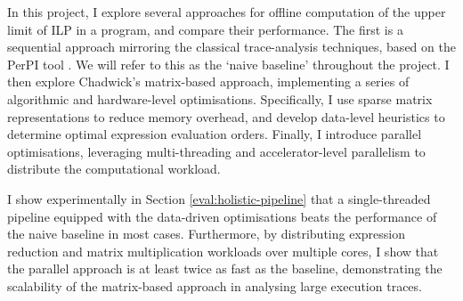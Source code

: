 In this project, I explore several approaches for offline computation of the upper limit of ILP in a program, and
compare their performance.
The first is a sequential approach mirroring the classical trace-analysis techniques, based on the PerPI tool \cite{perpi}. We will 
refer to this as the `naive baseline' throughout the project.
I then explore Chadwick's matrix-based approach, implementing a series of algorithmic and hardware-level optimisations.
Specifically, I use sparse matrix representations to reduce memory overhead, and develop data-level heuristics to 
determine optimal expression evaluation orders. Finally, I introduce parallel optimisations, leveraging multi-threading 
and accelerator-level parallelism to distribute the computational workload.

I show experimentally in Section \ref{eval:holistic-pipeline}
that a single-threaded pipeline equipped with the data-driven optimisations beats the performance 
of the naive baseline in most cases. Furthermore, by distributing expression reduction and matrix multiplication workloads over 
multiple cores, I show that the parallel approach is at least twice as fast as the baseline,
demonstrating the scalability of the matrix-based approach in analysing large execution traces.
